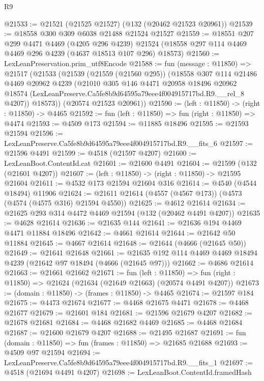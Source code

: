 \begin{lexlean}{R9}
\begin{coremodule}
@21533 := @21521 (@21525 @21527) (@132 (@20462 @21523 @20961))
@21539 := @18558 @300 @309 @6038 @21488 @21524 @21527
@21559 := @18551
    @207
    @299
    @4471
    @4469
    (@4205 @296 @4239)
    @21524
    (@18558 @297 @114 @4469 @4469 @296 @4239 (@4637 @18513 @107 @296) @18573)
@21560 := LexLeanPreservation.prim_utf8Encode
@21588 := fun (message : @11850) =>
  @21517
    (@21533
      (@21539
        (@21559 (@21560 @295))
        (@18558
          @307
          @114
          @21486
          @4469
          @20962
          @4239
          (@21010
            @305
            @146
            @4471
            @20958
            @18496
            @20962
            @18574
            (LexLeanPreserve.Ca5fe8b9d64595a79eee4f004915717bd.R9.__rel_8 @4207))
          @18573))
      (@20574 @21523 @20961))
@21590 := (left : @11850) -> (right : @11850) -> @4465
@21592 := fun (left : @11850) => fun (right : @11850) => @4474
@21593 := @4509 @173
@21594 := @11885 @18496
@21595 := @21593 @21594
@21596 := LexLeanPreserve.Ca5fe8b9d64595a79eee4f004915717bd.R9.__fits_6
@21597 := @21596 @4491
@21599 := @4518 (@21597 @4207)
@21600 := LexLeanBoot.ContentId.cat
@21601 := @21600 @4491
@21604 := @21599 (@132 (@21601 @4207))
@21607 := (left : @11850) -> (right : @11850) -> @21595 @21604
@21611 := @4532 @173 @21594 @21604 @316
@21614 := @4540 (@4544 @18494) @11906
@21624 := @21611 @21614 (@4557 (@4567 @173)) (@4573 (@4574 (@4575 @316) @21594 @4550))
@21625 := @4612 @21614
@21634 := @21625 @293 @314 @4472 @4469 @21594 (@132 (@20462 @4491 @4207))
@21635 := @4628 @21614
@21636 := @21635 @144
@21641 := @21636 @194 @4469 @4471 @11884 @18496
@21642 := @4661 @21614
@21644 := @21642 @50 @11884
@21645 := @4667 @21614
@21648 := @21644 (@4666 (@21645 @50))
@21649 := @21641 @21648
@21661 := @21635 @192 @114 @4469 @4469 @18494 @4239 (@21642 @97 @18494 (@4666 (@21645 @97)))
@21662 := @4686 @21614
@21663 := @21661 @21662
@21671 := fun (left : @11850) =>
  fun (right : @11850) => @21624 (@21634 (@21649 @21663) (@20574 @4491 @4207))
@21673 := (domain : @11850) -> (frames : @11850) -> @4465
@21674 := @21597 @184
@21675 := @4473 @21674
@21677 := @4468 @21675 @4471
@21678 := @4468 @21677
@21679 := @21601 @184
@21681 := @21596 @21679 @4207
@21682 := @21678 @21681
@21684 := @4468 @21682 @4469
@21685 := @4468 @21684
@21687 := @21600 @21679 @4207
@21688 := @21495 @21687
@21691 := fun (domain : @11850) => fun (frames : @11850) => @21685 @21688
@21693 := @4509 @97 @21594
@21694 := LexLeanPreserve.Ca5fe8b9d64595a79eee4f004915717bd.R9.__fits_1
@21697 := @4518 (@21694 @4491 @4207)
@21698 := LexLeanBoot.ContentId.framedHash

\end{coremodule}
\end{lexlean}
